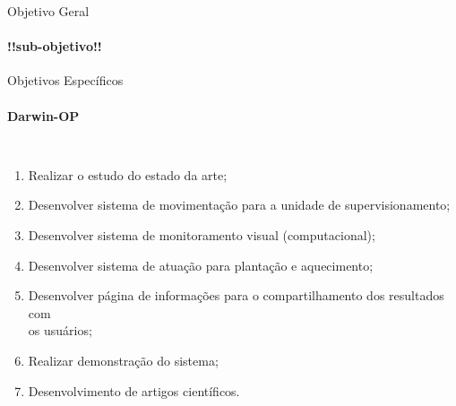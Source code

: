 \begin{frame}[c]{Objetivo Geral} 
    \framesubtitle{!!sub-objetivo!!}
    \transdissolve[duration=0.5]
   
    \begin{center}
    \end{center}
    
   
\end{frame}
\begin{frame}[t]{Objetivos Específicos}
    \transboxout[duration=0.5]
    \framesubtitle{Darwin-OP}
    \begin{columns}
            \begin{enumerate}
                \item Realizar o estudo do estado da arte;
                \item Desenvolver sistema de movimentação para a unidade de supervisionamento;
                \item Desenvolver sistema de monitoramento visual (computacional);
                \item Desenvolver sistema de atuação para plantação e aquecimento;
                \item Desenvolver página de informações para o compartilhamento dos resultados com 
                \\ os usuários;
                \item Realizar demonstração do sistema;
                \item Desenvolvimento de artigos científicos.

            \end{enumerate}
    \end{columns}
\end{frame}

